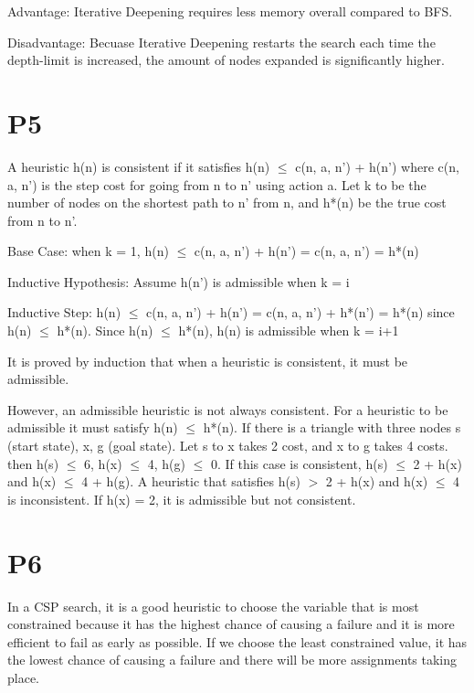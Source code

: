 \documentclass{article}
\begin{document}
\hspace{5mm}

Advantage: Iterative Deepening requires less memory overall compared to BFS.

Disadvantage: Becuase Iterative Deepening restarts the search each time the depth-limit is increased, the amount of nodes expanded is significantly higher.

\section*{P5}

\hspace{5mm}

A heuristic h(n) is consistent if it satisfies h(n) $\le$ c(n, a, n’) + h(n’) where c(n, a, n’) is the step cost for going from n to n’ using action a. Let k to be the number of nodes on the shortest path to n’ from n, and h*(n) be the true cost from n to n’.

Base Case: when k = 1, h(n) $\le$ c(n, a, n’) + h(n’) = c(n, a, n’) = h*(n)

Inductive Hypothesis: Assume h(n’) is admissible when k = i

Inductive Step: h(n) $\le$ c(n, a, n’) + h(n’) = c(n, a, n’) + h*(n’) = h*(n) since h(n) $\le$ h*(n). Since h(n) $\le$ h*(n), h(n) is admissible when k = i+1

It is proved by induction that when a heuristic is consistent, it must be admissible.

However, an admissible heuristic is not always consistent.
For a heuristic to be admissible it must satisfy h(n) $\le$ h*(n). If there is a triangle with three nodes s (start state), x, g (goal state). Let s to x takes 2 cost, and x to g takes 4 costs. then h(s) $\le$ 6, h(x) $\le$ 4, h(g) $\le$ 0. If this case is consistent, h(s) $\le$ 2 + h(x) and h(x) $\le$ 4 + h(g). A heuristic that satisfies h(s) $>$ 2 + h(x) and h(x) $\le$ 4 is inconsistent. If h(x) = 2, it is admissible but not consistent.

\section*{P6}

\hspace{5mm}

In a CSP search, it is a good heuristic to choose the variable that is most constrained because it has the highest chance of causing a failure and it is more efficient to fail as early as possible. If we choose the least constrained value, it has the lowest chance of causing a failure and there will be more assignments taking place.
\end{document}
